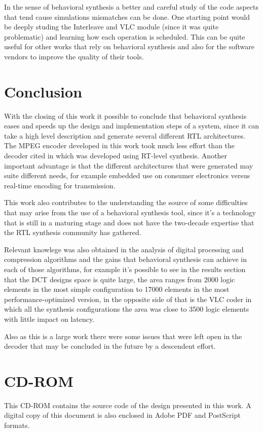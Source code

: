 \documentclass[a4paper, 12pt]{article}
\begin{document}
In the sense of behavioral synthesis a better and careful study of the code aspects that tend cause simulations mismatches can be done. One starting point would be deeply studing the Interleave and VLC module (since it was quite problematic) and learning how each operation is scheduled. This can be quite useful for other works that rely on behavioral synthesis and also for the software vendors to improve the quality of their tools.

\pagebreak

\section*{Conclusion}
{}

With the closing of this work it possible to conclude that behavioral synthesis eases and speeds up the design and implementation steps of a system, since it can take a high level description and generate several different RTL architectures. The MPEG encoder developed in this work took much less effort than the decoder cited in \cite{brazilip} which was developed using RT-level synthesis. Another important advantage is that the different architectures that were generated may suite different needs, for example embedded use on consumer electronics versus real-time encoding for transmission.

This work also contributes to the understanding the source of some difficulties that may arise from the use of a behavioral synthesis tool, since it's a technology that is still in a maturing stage and does not have the two-decade expertise that the RTL synthesis community has gathered.

Relevant knowlege was also obtained in the analysis of digital processing and compression algorithms and the gains that behavioral synthesis can achieve in each of those algorithms, for example it's possible to see in the results section that the DCT designs space is quite large, the area ranges from 2000 logic elements in the most simple configuration to 17000 elements in the most performance-optimized version, in the opposite side of that is the VLC coder in which all the synthesis configurations the area was close to 3500 logic elements with little impact on latency.

Also as this is a large work there were some issues that were left open in the decoder that may be concluded in the future by a descendent effort.

\pagebreak

{}



\pagebreak
\section*{CD-ROM}
This CD-ROM contains the source code of the design presented in this work. A digital copy of this document is also enclosed in Adobe PDF and PostScript formats.
\end{document}
